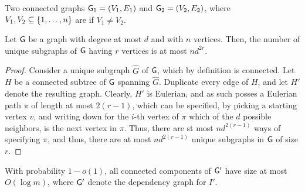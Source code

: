\begin{defn}
    Two connected graphs $\mathsf{G}_1=(V_1, E_1)$ and $\mathsf{G}_2=(V_2,
    E_2)$, where $V_1, V_2 \subseteq \left\{ {1,\ldots, n} \right\}$ are
     if $V_1 \ne V_2$. 
\end{defn}

\begin{lemma}
    Let $\mathsf{G}$ be a graph with degree at most $d$ and with $n$
    vertices. Then, the number of unique subgraphs of $\mathsf{G}$ having
    $r$ vertices is at most $nd^{2r}$.
\end{lemma}

\begin{proof}
    Consider a unique subgraph $\widehat{G}$ of $\mathsf{G}$, which by
    definition is connected.  Let $H$ be a connected subtree of $\mathsf{G}$
    spanning $\widehat{G}$. Duplicate every edge of $H$, and let $H'$
    denote the resulting graph. Clearly, $H'$ is Eulerian, and as such
    posses a Eulerian path $\pi$ of length at most $2(r-1)$, which can
    be specified, by picking a starting vertex $v$, and writing down
    for the $i$-th vertex of $\pi$ which of the $d$ possible
    neighbors, is the next vertex in $\pi$.  Thus, there are st most
    $nd^{2(r-1)}$ ways of specifying $\pi$, and thus, there are at
    most $nd^{2(r-1)}$ unique subgraphs in $\mathsf{G}$ of size $r$.
\end{proof}

\begin{lemma}
    With probability $1- o(1)$, all connected components of $\mathsf{G}'$ have
    size at most $O( \log{m})$, where $\mathsf{G}'$ denote the dependency graph
    for $I'$. 
\end{lemma}

